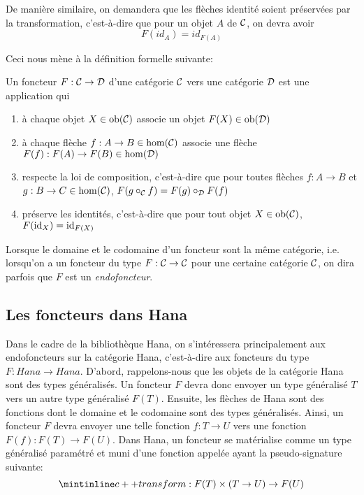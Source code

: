De manière similaire, on demandera que les flèches identité soient préservées
par la transformation, c'est-à-dire que pour un objet $A$ de $\mathcal{C}$, on devra
avoir
\[
    F(id_A) = id_{F(A)}
\]

Ceci nous mène à la définition formelle suivante:

\begin{définition}[Foncteur]
    Un foncteur $F : \mathcal{C} \to \mathcal{D}$ d'une catégorie $\mathcal{C}$ vers une catégorie $\mathcal{D}$
    est une application qui
    \begin{enumerate}
        \item à chaque objet $X \in \mathrm{ob}(\mathcal{C})$ associe un objet $F(X) \in \mathrm{ob}(\mathcal{D})$
        \item à chaque flèche $f : A \to B \in \hom(\mathcal{C})$ associe une flèche
              $F(f) : F(A) \to F(B) \in \hom(\mathcal{D})$
        \item respecte la loi de composition, c'est-à-dire que pour toutes
              flèches $f : A \to B$ et $g : B \to C \in \hom(\mathcal{C})$,
              $F(g \circ_{\mathcal{C}} f) = F(g) \circ_{\mathcal{D}} F(f)$
        \item préserve les identités, c'est-à-dire que pour tout objet
              $X \in \mathrm{ob}(\mathcal{C})$, $F(\mathrm{id}_X) = \mathrm{id}_{F(X)}$
    \end{enumerate}
\end{définition}

Lorsque le domaine et le codomaine d'un foncteur sont la même catégorie, i.e.
lorsqu'on a un foncteur du type $F : \mathcal{C} \to \mathcal{C}$ pour une certaine catégorie
$\mathcal{C}$, on dira parfois que $F$ est un \textit{endofoncteur}.


\subsection{Les foncteurs dans Hana}
Dans le cadre de la bibliothèque Hana, on s'intéressera principalement aux
endofoncteurs sur la catégorie Hana, c'est-à-dire aux foncteurs du type
$F : Hana \to Hana$. D'abord, rappelons-nous que les objets de la catégorie
Hana sont des types généralisés. Un foncteur $F$ devra donc envoyer un type
généralisé $T$ vers un autre type généralisé $F(T)$. Ensuite, les flèches de
Hana sont des fonctions dont le domaine et le codomaine sont des types
généralisés. Ainsi, un foncteur $F$ devra envoyer une telle fonction
$f : T \to U$ vers une fonction $F(f) : F(T) \to F(U)$. Dans Hana, un
foncteur se matérialise comme un type généralisé paramétré et muni d'une
fonction appelée  ayant la pseudo-signature suivante:
\[
    \icpp{transform} : F(T) \times (T \to U) \to F(U)
\]

